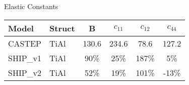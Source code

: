\documentclass[preview]{standalone}
\begin{document}
    \begin{center}
    \textnormal{Elastic Constants} \\
    \vspace{2mm}
    \begin{tabular}{ l l c c c c } \toprule 
Model & Struct & B & $c_{11}$ & $c_{12}$ & $c_{44}$\\ \midrule 
CASTEP & TiAl & 130.6 & 234.6 & 78.6 & 127.2\\ 
SHIP\_v1 & TiAl & 90\% & 25\% & 187\% & 5\%\\ 
SHIP\_v2 & TiAl & 52\% & 19\% & 101\% & -13\%\\ 
 \bottomrule
    \end{tabular}
    \end{center}
    
\end{document}
